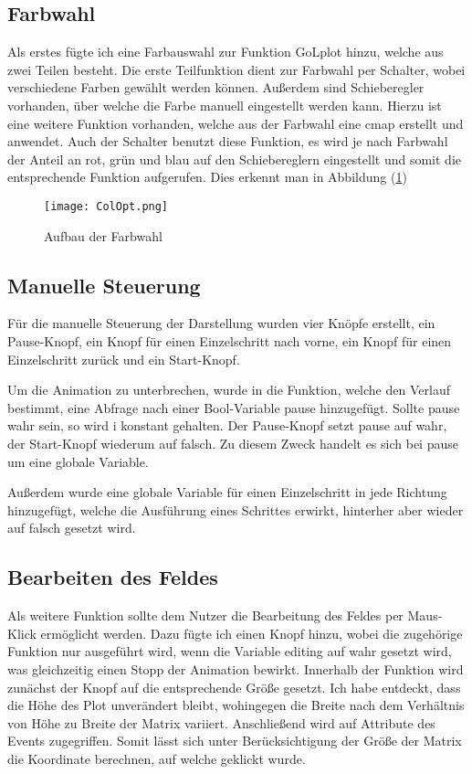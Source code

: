 \documentclass{scrartcl}
\begin{document}
\subsection{Farbwahl}
Als erstes fügte ich eine Farbauswahl zur Funktion GoLplot hinzu, welche aus zwei Teilen besteht. Die erste Teilfunktion dient zur Farbwahl per Schalter, wobei verschiedene Farben gewählt werden können. Außerdem sind Schieberegler vorhanden, über welche die Farbe manuell eingestellt werden kann. Hierzu ist eine weitere Funktion vorhanden, welche aus der Farbwahl eine cmap erstellt und anwendet. Auch der Schalter benutzt diese Funktion, es wird je nach Farbwahl der Anteil an rot, grün und blau auf den Schiebereglern eingestellt und somit die entsprechende Funktion aufgerufen. Dies erkennt man in Abbildung (\ref{col})

\begin{figure}[!h]
	\begin{center}
		\texttt{[image: ColOpt.png]}
		\caption{Aufbau der Farbwahl}
		\label{col}
	\end{center}
\end{figure}

\subsection{Manuelle Steuerung}
Für die manuelle Steuerung der Darstellung wurden vier Knöpfe erstellt, ein Pause-Knopf, ein Knopf für einen Einzelschritt nach vorne, ein Knopf für einen Einzelschritt zurück und ein Start-Knopf.

Um die Animation zu unterbrechen, wurde in die Funktion, welche den Verlauf bestimmt, eine Abfrage nach einer Bool-Variable pause hinzugefügt. Sollte pause wahr sein, so wird i konstant gehalten. Der Pause-Knopf setzt pause auf wahr, der Start-Knopf wiederum auf falsch. Zu diesem Zweck handelt es sich bei pause um eine globale Variable.

Außerdem wurde eine globale Variable für einen Einzelschritt in jede Richtung hinzugefügt, welche die Ausführung eines Schrittes erwirkt, hinterher aber wieder auf falsch gesetzt wird.

\subsection{Bearbeiten des Feldes}
Als weitere Funktion sollte dem Nutzer die Bearbeitung des Feldes per Maus-Klick ermöglicht werden. Dazu fügte ich einen Knopf hinzu, wobei die zugehörige Funktion nur ausgeführt wird, wenn die Variable editing auf wahr gesetzt wird, was gleichzeitig einen Stopp der Animation bewirkt.
Innerhalb der Funktion wird zunächst der Knopf auf die entsprechende Größe gesetzt. Ich habe entdeckt, dass die Höhe des Plot unverändert bleibt, wohingegen die Breite nach dem Verhältnis von Höhe zu Breite der Matrix variiert. Anschließend wird auf Attribute des Events zugegriffen. Somit lässt sich unter Berücksichtigung der Größe der Matrix die Koordinate berechnen, auf welche geklickt wurde.
\end{document}
